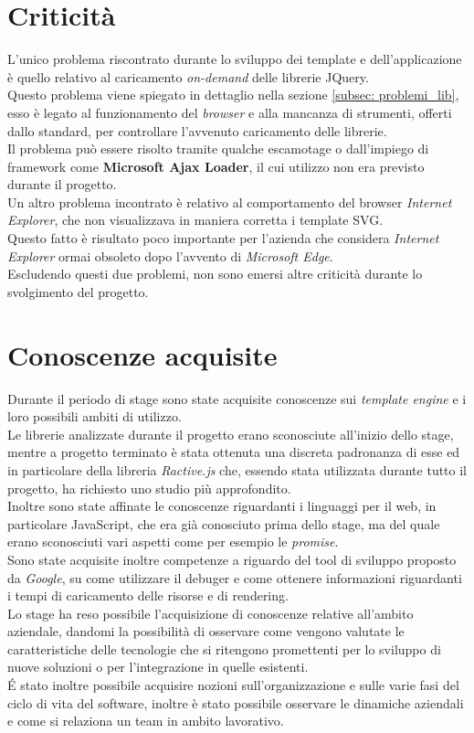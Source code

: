 \section{Criticità}
L'unico problema riscontrato durante lo sviluppo dei template e dell'applicazione è quello relativo al caricamento \textit{on-demand} delle librerie JQuery.\\
Questo problema viene spiegato in dettaglio nella sezione \ref{subsec: problemi_lib}, esso è legato al funzionamento del \textit{browser} e alla mancanza di strumenti, offerti dallo standard, per controllare l'avvenuto caricamento delle librerie.\\
Il problema può essere risolto tramite qualche escamotage o dall'impiego di framework come \textbf{Microsoft Ajax Loader}, il cui utilizzo non era previsto durante il progetto.\\
Un altro problema incontrato è relativo al comportamento del browser \textit{Internet Explorer}, che non visualizzava in maniera corretta i template SVG.\\
Questo fatto è risultato poco importante per l'azienda che considera \textit{Internet Explorer} ormai obsoleto dopo l'avvento di \textit{Microsoft Edge}.\\
Escludendo questi due problemi, non sono emersi altre criticità durante lo svolgimento del progetto.
 
\section{Conoscenze acquisite}
Durante il periodo di stage sono state acquisite conoscenze sui \textit{template engine} e i loro possibili ambiti di utilizzo.\\
Le librerie analizzate durante il progetto erano sconosciute all'inizio dello stage, mentre a progetto terminato è stata ottenuta una discreta padronanza di esse ed in particolare della libreria \textit{Ractive.js} che, essendo stata utilizzata durante tutto il progetto, ha richiesto uno studio più approfondito.\\
Inoltre sono state affinate le conoscenze riguardanti i linguaggi per il web, in particolare JavaScript, che era già conosciuto prima dello stage, ma del quale erano sconosciuti vari aspetti come per esempio le \textit{promise}.\\
Sono state acquisite inoltre competenze a riguardo del tool di sviluppo proposto da \textit{Google}, su come utilizzare il debuger e come ottenere informazioni riguardanti i tempi di caricamento delle risorse e di rendering.\\
Lo stage ha reso possibile l'acquisizione di conoscenze relative all'ambito aziendale, dandomi la possibilità di osservare come vengono valutate le caratteristiche delle tecnologie che si ritengono promettenti per lo sviluppo di nuove soluzioni o per l'integrazione in quelle esistenti.\\
\'E stato inoltre possibile acquisire nozioni sull'organizzazione e sulle varie fasi del ciclo di vita del software, inoltre è stato possibile osservare le dinamiche aziendali e come si relaziona un team in ambito lavorativo.
